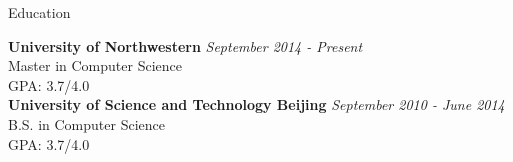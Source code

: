 \documentclass{resume} %
\begin{document}

\begin{rSection}{Education}

{\bf University of Northwestern} \hfill {\em September 2014 - Present} \\ 
Master in Computer Science \\
GPA: 3.7/4.0\\
{\bf University of Science and Technology Beijing} \hfill {\em September 2010 - June 2014} \\ 
B.S. in Computer Science \\
GPA: 3.7/4.0\\
\end{rSection}

\end{document}
